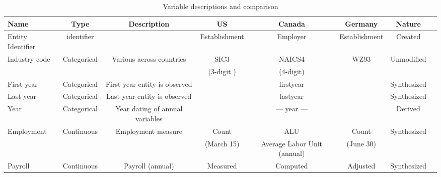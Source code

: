 \begin{table}[H]
  \centering\footnotesize
  \caption{Variable descriptions and comparison}  \label{tab:common_Variable} \medskip
  \renewcommand{\arraystretch}{1}
  \begin{tabular}{l  c c c c c c c}
    \toprule
    \textbf{Name}&\textbf{Type} &\textbf{Description} &\textbf{US} & \textbf{Canada} &\textbf{Germany} &\textbf{Nature}\\
    \midrule
Entity Identifier& identifier& & Establishment & Employer & Establishment &Created\\
Industry code&Categorical& Various across countries &SIC3 & NAICS4 & WZ93 &Unmodified\\
             &           &                          &(3-digit )& (4-digit) &  &\\
First year&Categorical&First year entity is observed &\multicolumn{3}{c}{--- firstyear ---}&Synthesized\\
Last year&Categorical&Last year entity is observed &\multicolumn{3}{c}{--- lastyear ---}&Synthesized\\
Year&Categorical&Year dating of annual variables&\multicolumn{3}{c}{--- year ---}&Derived\\
Employment & Continuous & Employment measure & Count & ALU & Count & Synthesized \\
            &            &                    & (March 15) &Average Labor Unit (annual)& (June 30)&\\
Payroll&Continuous&  Payroll (annual)& Measured & Computed & Adjusted &Synthesized\\
   \bottomrule
  \end{tabular} 
\end{table}